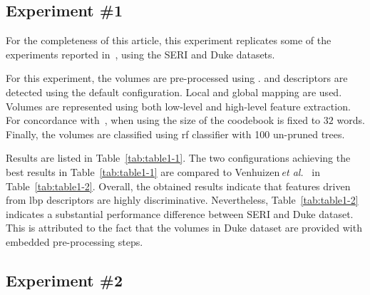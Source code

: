 \subsection{Experiment \#1}\label{subsec:exp1}

%
%
%

For the completeness of this article, this experiment replicates some of the experiments reported in~\cite{Lemaintre2015miccaiOCT}, using the SERI and Duke datasets.

For this experiment, the volumes are pre-processed using \nlm.
\lbp and \lbptop descriptors are detected using the default configuration.
Local and global mapping are used.
Volumes are represented using both low-level and high-level feature extraction. For concordance with~\cite{Lemaintre2015miccaiOCT}, when using \bow the size of the coodebook is fixed to $32$ words.
Finally, the volumes are classified using \ac{rf} classifier with 100 un-pruned trees.

Results are listed in Table~\ref{tab:table1-1}.
The two configurations achieving the best results in Table~\ref{tab:table1-1} are compared to Venhuizen\,\textit{et al.}~\cite{Venhuizen2015} in Table~\ref{tab:table1-2}. 
Overall, the obtained results indicate that features driven from \ac{lbp} descriptors are highly discriminative.
Nevertheless, Table~\ref{tab:table1-2} indicates a substantial performance difference between SERI and Duke dataset.
This is attributed to the fact that the volumes in Duke dataset are provided with embedded pre-processing steps.






\subsection{Experiment \#2}\label{subsec:exp2}
%
%
%
%

